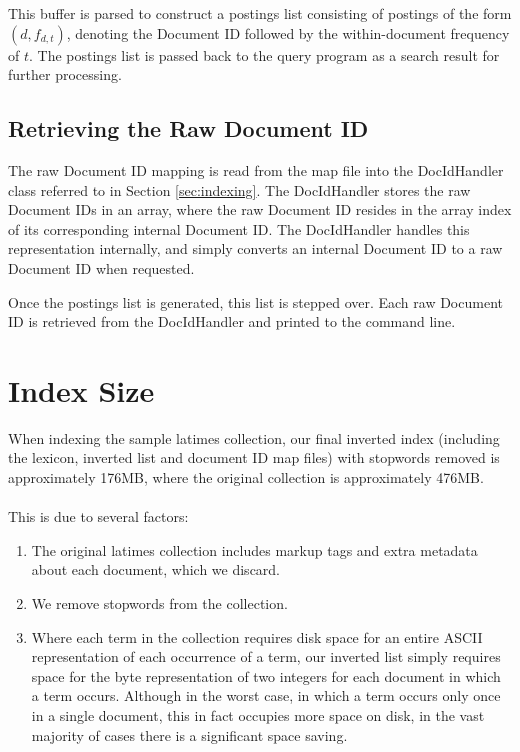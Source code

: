 This buffer is parsed to construct a postings list consisting of postings of the form $(d, f_{d,t})$, denoting the Document ID followed by the within-document frequency of $t$. The postings list is passed back to the query program as a search result for further processing.

\subsection*{Retrieving the Raw Document ID}

The raw Document ID mapping is read from the map file into the DocIdHandler class referred to in Section \ref{sec:indexing}. The DocIdHandler stores the raw Document IDs in an array, where the raw Document ID resides in the array index of its corresponding internal Document ID. The DocIdHandler handles this representation internally, and simply converts an internal Document ID to a raw Document ID when requested.

Once the postings list is generated, this list is stepped over. Each raw Document ID is retrieved from the DocIdHandler and printed to the command line.


\section{Index Size}
\label{sec:indexsize}

When indexing the sample latimes collection, our final inverted index (including the lexicon, inverted list and document ID map files) with stopwords removed is approximately 176MB, where the original collection is approximately 476MB.

\paragraph{}
This is due to several factors:

\begin{enumerate}
	\item The original latimes collection includes markup tags and extra metadata about each document, which we discard.
	\item We remove stopwords from the collection.
	\item Where each term in the collection requires disk space for an entire ASCII representation of each occurrence of a term, our inverted list simply requires space for the byte representation of two integers for each document in which a term occurs. Although in the worst case, in which a term occurs only once in a single document, this in fact occupies more space on disk, in the vast majority of cases there is a significant space saving.
\end{enumerate}